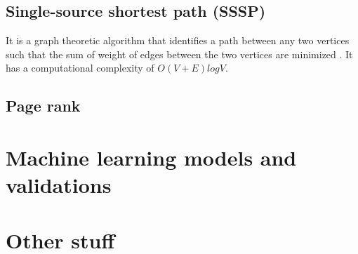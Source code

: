 \subsection{Single-source shortest path (SSSP)}
It is a graph theoretic algorithm that identifies a path between any two vertices such that the sum of weight of edges between the two vertices are minimized \cite{johnson1977efficient}. It has a computational complexity of $O(V+E) log V$.
\subsection{Page rank}


\section{Machine learning models and validations}
\section{Other stuff}